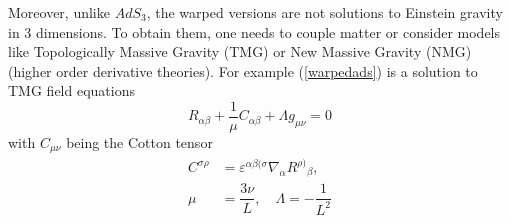 \documentclass[preprint,aps,tightenlines,showkeys,nofootinbib,superscriptaddress,amsmath]{revtex4}
\begin{document}
Moreover, unlike $AdS_3$, the warped versions are not solutions to
Einstein gravity in 3 dimensions. To obtain them, one needs to couple
matter or consider models like Topologically Massive Gravity (TMG) or New
Massive Gravity (NMG) (higher order derivative theories). For example
(\ref{warpedads}) is a solution to TMG field equations
\begin{equation}
  R_{\alpha\beta}+\frac{1}{\mu } C_{\alpha \beta }+\Lambda g_{\mu  \nu }=0
\end{equation}
with $C_{\mu \nu }$ being the Cotton tensor
\begin{eqnarray}
  C^{\sigma \rho }&=\varepsilon^{\alpha \beta (\sigma }\nabla_{\alpha
  }R^{\rho) }{}_{\beta },\nonumber\\
  \mu &=\dfrac{3\nu}{L},\quad\Lambda=-\dfrac{1}{L^{2} }
\end{eqnarray}
\end{document}
